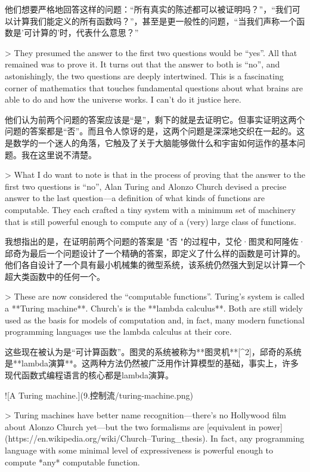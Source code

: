 \documentclass[cn,11pt,chinese]{elegantbook}
\begin{document}
{他们想要严格地回答这样的问题：“所有真实的陈述都可以被证明吗？”，“我们可以计算我们能定义的所有函数吗？”，甚至是更一般性的问题，“当我们声称一个函数是'可计算的'时，代表什么意思？”

> They presumed the answer to the first two questions would be “yes”. All that remained was to prove it. It turns out that the answer to both is “no”, and astonishingly, the two questions are deeply intertwined. This is a fascinating corner of mathematics that touches fundamental questions about what brains are able to do and how the universe works. I can’t do it justice here.

他们认为前两个问题的答案应该是“是”，剩下的就是去证明它。但事实证明这两个问题的答案都是“否”。而且令人惊讶的是，这两个问题是深深地交织在一起的。这是数学的一个迷人的角落，它触及了关于大脑能够做什么和宇宙如何运作的基本问题。我在这里说不清楚。

> What I do want to note is that in the process of proving that the answer to the first two questions is “no”, Alan Turing and Alonzo Church devised a precise answer to the last question—a definition of what kinds of functions are computable. They each crafted a tiny system with a minimum set of machinery that is still powerful enough to compute any of a (very) large class of functions.

我想指出的是，在证明前两个问题的答案是 "否 "的过程中，艾伦·图灵和阿隆佐·邱奇为最后一个问题设计了一个精确的答案，即定义了什么样的函数是可计算的。他们各自设计了一个具有最小机械集的微型系统，该系统仍然强大到足以计算一个超大类函数中的任何一个。

> These are now considered the “computable functions”. Turing’s system is called a **Turing machine**. Church’s is the **lambda calculus**. Both are still widely used as the basis for models of computation and, in fact, many modern functional programming languages use the lambda calculus at their core.

这些现在被认为是“可计算函数”。图灵的系统被称为**图灵机**[^2]，邱奇的系统是**lambda演算**。这两种方法仍然被广泛用作计算模型的基础，事实上，许多现代函数式编程语言的核心都是lambda演算。

![A Turing machine.](9.控制流/turing-machine.png)

> Turing machines have better name recognition—there’s no Hollywood film about Alonzo Church yet—but the two formalisms are [equivalent in power](https://en.wikipedia.org/wiki/Church–Turing_thesis). In fact, any programming language with some minimal level of expressiveness is powerful enough to compute *any* computable function.

}
\end{document}
